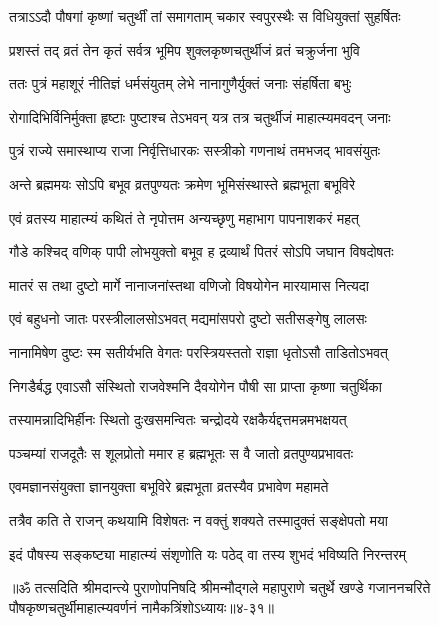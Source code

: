 \twolineshloka
{तत्राऽऽदौ पौषगां कृष्णां चतुर्थीं तां समागताम्}
{चकार स्वपुरस्थैः स विधियुक्तां सुहर्षितः} %

\twolineshloka
{प्रशस्तं तद् व्रतं तेन कृतं सर्वत्र भूमिप}
{शुक्लकृष्णचतुर्थीजं व्रतं चक्रुर्जना भुवि} %

\twolineshloka
{ततः पुत्रं महाशूरं नीतिज्ञं धर्मसंयुतम्}
{लेभे नानागुणैर्युक्तं जनाः संहर्षिता बभुः} %

\twolineshloka
{रोगादिभिर्विनिर्मुक्ता हृष्टाः पुष्टाश्च तेऽभवन्}
{यत्र तत्र चतुर्थीजं माहात्म्यमवदन् जनाः} %

\twolineshloka
{पुत्रं राज्ये समास्थाप्य राजा निर्वृत्तिधारकः}
{सस्त्रीको गणनाथं तमभजद् भावसंयुतः} %

\twolineshloka
{अन्ते ब्रह्ममयः सोऽपि बभूव व्रतपुण्यतः}
{क्रमेण भूमिसंस्थास्ते ब्रह्मभूता बभूविरे} %

\twolineshloka
{एवं व्रतस्य माहात्म्यं कथितं ते नृपोत्तम}
{अन्यच्छृणु महाभाग पापनाशकरं महत्} %

\twolineshloka
{गौडे कश्चिद् वणिक् पापी लोभयुक्तो बभूव ह}
{द्रव्यार्थं पितरं सोऽपि जघान विषदोषतः} %

\twolineshloka
{मातरं स तथा दुष्टो मार्गे नानाजनांस्तथा}
{वणिजो विषयोगेन मारयामास नित्यदा} %

\twolineshloka
{एवं बहुधनो जातः परस्त्रीलालसोऽभवत्}
{मद्यमांसपरो दुष्टो सतीसङ्गेषु लालसः} %

\twolineshloka
{नानामिषेण दुष्टः स्म सतीर्यभति वेगतः}
{परस्त्रियस्ततो राज्ञा धृतोऽसौ ताडितोऽभवत्} %

\twolineshloka
{निगडैर्बद्ध एवाऽसौ संस्थितो राजवेश्मनि}
{दैवयोगेन पौषी सा प्राप्ता कृष्णा चतुर्थिका} %

\twolineshloka
{तस्यामन्नादिभिर्हीनः स्थितो दुःखसमन्वितः}
{चन्द्रोदये रक्षकैर्यद्दत्तमन्नमभक्षयत्} %

\twolineshloka
{पञ्चम्यां राजदूतैः स शूलप्रोतो ममार ह}
{ब्रह्मभूतः स वै जातो व्रतपुण्यप्रभावतः} %

\twolineshloka
{एवमज्ञानसंयुक्ता ज्ञानयुक्ता बभूविरे}
{ब्रह्मभूता व्रतस्यैव प्रभावेण महामते} %

\twolineshloka
{तत्रैव कति ते राजन् कथयामि विशेषतः}
{न वक्तुं शक्यते तस्मादुक्तं सङ्क्षेपतो मया} %

\twolineshloka
{इदं पौषस्य सङ्कष्ट्या माहात्म्यं संश‍ृणोति यः}
{पठेद् वा तस्य शुभदं भविष्यति निरन्तरम्} %

॥ॐ तत्सदिति श्रीमदान्त्ये पुराणोपनिषदि श्रीमन्मौद्गले महापुराणे चतुर्थे खण्डे गजाननचरिते पौषकृष्णचतुर्थीमाहात्म्यवर्णनं नामैकत्रिंशोऽध्यायः॥४-३१॥


